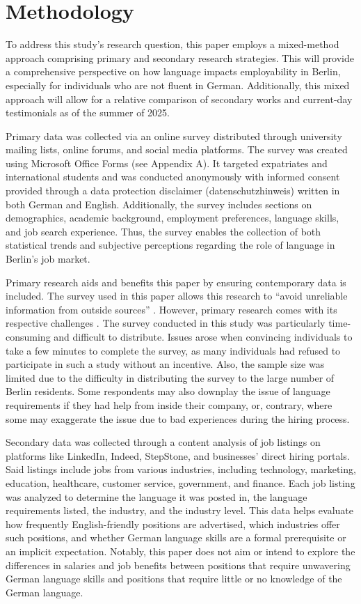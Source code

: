 \chapter{Methodology}

To address this study’s research question, this paper employs a mixed-method approach comprising primary and secondary research strategies. This will provide a comprehensive perspective on how language impacts employability in Berlin, especially for individuals who are not fluent in German. Additionally, this mixed approach will allow for a relative comparison of secondary works and current-day testimonials as of the summer of 2025.

Primary data was collected via an online survey distributed through university mailing lists, online forums, and social media platforms. The survey was created using Microsoft Office Forms (see Appendix A). It targeted expatriates and international students and was conducted anonymously with informed consent provided through a data protection disclaimer (datenschutzhinweis) written in both German and English. Additionally, the survey includes sections on demographics, academic background, employment preferences, language skills, and job search experience. Thus, the survey enables the collection of both statistical trends and subjective perceptions regarding the role of language in Berlin’s job market.

Primary research aids and benefits this paper by ensuring contemporary data is included. The survey used in this paper allows this research to “avoid unreliable information from outside sources” \citep{Indeed25}. However, primary research comes with its respective challenges \citep{k2024crucial}. The survey conducted in this study was particularly time-consuming and difficult to distribute. Issues arose when convincing individuals to take a few minutes to complete the survey, as many individuals had refused to participate in such a study without an incentive. Also, the sample size was limited due to the difficulty in distributing the survey to the large number of Berlin residents. Some respondents may also downplay the issue of language requirements if they had help from inside their company, or, contrary, where some may exaggerate the issue due to bad experiences during the hiring process.

Secondary data was collected through a content analysis of job listings on platforms like LinkedIn, Indeed, StepStone, and businesses’ direct hiring portals. Said listings include jobs from various industries, including technology, marketing, education, healthcare, customer service, government, and finance. Each job listing was analyzed to determine the language it was posted in, the language requirements listed, the industry, and the industry level. This data helps evaluate how frequently English-friendly positions are advertised, which industries offer such positions, and whether German language skills are a formal prerequisite or an implicit expectation. Notably, this paper does not aim or intend to explore the differences in salaries and job benefits between positions that require unwavering German language skills and positions that require little or no knowledge of the German language.  

